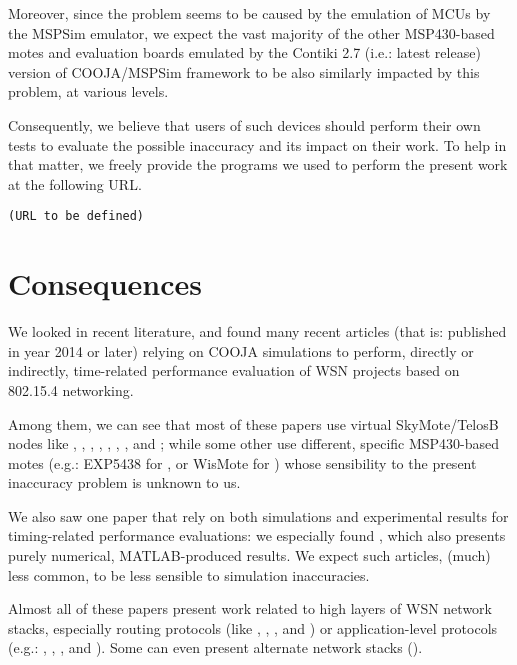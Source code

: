 \documentclass[10pt,final,journal,twocolumn]{IEEEtran}
\begin{document}
Moreover, since the problem seems to be caused by the emulation of
MCUs by the MSPSim emulator, we expect the vast majority of the other
MSP430-based motes and evaluation boards emulated by the Contiki 2.7
(i.e.: latest release) version of COOJA/MSPSim framework to be also similarly
impacted by this problem, at various levels.

Consequently, we believe that users of such devices should perform their
own tests to evaluate the possible inaccuracy and its impact on their work.
To help in that matter, we freely provide the programs we used to perform the
present work at the following URL.

\begin{center}
\texttt{(URL to be defined)}
\end{center}



\section{Consequences}
\label{consequences}

We looked in recent literature, and found many recent articles (that is:
published in year 2014 or later) relying on COOJA simulations to perform,
directly or indirectly, time-related performance evaluation of WSN projects
based on 802.15.4 networking.

Among them, we can see that most of these papers use virtual SkyMote/TelosB
nodes like
\cite{Constrain-Routing-Trees-2014},
\cite{Co-RPL-2014}, \cite{DINAS-2014},
\cite{Efficient-Distrib-Svc-Discovery-2014},
\cite{IETF-Routing-WSN-2014},
\cite{TinySDN-2014}, \cite{Trickle-L2-2014},
and \cite{Visual-Sensor-Networks-2014};
while some other use different, specific MSP430-based motes
(e.g.: EXP5438 for \cite{Key-Mgmt-2015}, or WisMote for
\cite{Lightweight-Multicast-Forwarding-2014}) whose sensibility
to the present inaccuracy problem is unknown to us.

We also saw one paper that rely on both simulations and experimental
results for timing-related performance evaluations: we especially found
\cite{Probing-Mech-wu-2015}, which also presents purely numerical,
MATLAB-produced results. We expect such articles, (much) less common,
to be less sensible to simulation inaccuracies.

Almost all of these papers present work related to high layers of
WSN network stacks, especially routing protocols (like
\cite{Constrain-Routing-Trees-2014},
\cite{Co-RPL-2014}, \cite{IETF-Routing-WSN-2014},
and \cite{Trickle-L2-2014})
or application-level protocols (e.g.: \cite{DINAS-2014},
\cite{Efficient-Distrib-Svc-Discovery-2014},
\cite{Visual-Sensor-Networks-2014}, and \cite{Key-Mgmt-2015}).
Some can even present alternate network stacks (\cite{TinySDN-2014}).
\end{document}
